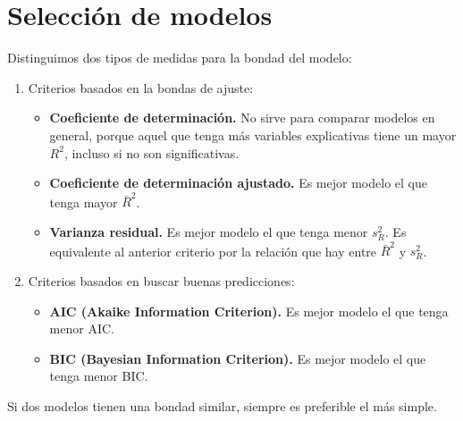 \section{Selección de modelos}
Distinguimos dos tipos de medidas para la bondad del modelo:
\begin{enumerate}
    \item Criterios basados en la bondas de ajuste:
          \begin{itemize}
              \item \textbf{Coeficiente de determinación.}
                    No sirve para comparar modelos en general, porque aquel que tenga más variables explicativas tiene un mayor $R^2$, incluso si no son significativas.
              \item \textbf{Coeficiente de determinación ajustado.}
                    Es mejor modelo el que tenga mayor $\bar{R}^2$.
              \item \textbf{Varianza residual.}
                    Es mejor modelo el que tenga menor $s_R^2$.
                    Es equivalente al anterior criterio por la relación que hay entre $\bar{R}^2$ y $s_R^2$.
          \end{itemize}
    \item Criterios basados en buscar buenas predicciones:
          \begin{itemize}
              \item \textbf{AIC (Akaike Information Criterion).}
                    Es mejor modelo el que tenga menor AIC.
              \item \textbf{BIC (Bayesian Information Criterion).}
                    Es mejor modelo el que tenga menor BIC.
          \end{itemize}
\end{enumerate}

Si dos modelos tienen una bondad similar, siempre es preferible el más simple.